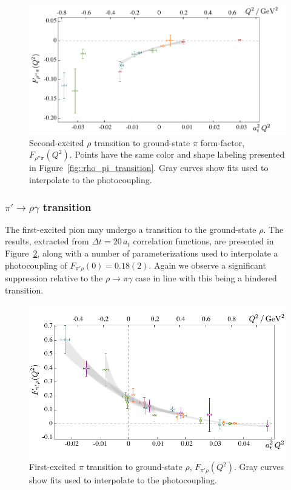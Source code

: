 \documentclass[twocolumn,amsmath,amssymb,prd,10pt,floatfix, 
superscriptaddress,nofootinbib, showpacs, preprintnumbers]{revtex4-1}
\begin{document}
\begin{figure}[h]
  \includegraphics[width=\linewidth]{fig20.pdf}
    \caption{ Second-excited $\rho$ transition to ground-state $\pi$ form-factor, $F_{\rho'' \pi}(Q^2)$. Points have the same color and shape labeling presented in Figure~\ref{fig::rho_pi_transition}. Gray curves show fits used to interpolate to the photocoupling. 
     \label{fig::rho2_pi_transition}}
\end{figure}



\subsubsection{$\pi' \rightarrow \rho \gamma$ transition}



The first-excited pion may undergo a transition to the ground-state $\rho$. The results, extracted from $\Delta t = 20 \, a_t$ correlation functions, are presented in Figure~\ref{fig::pi1_rho0_transition}, along with a number of parameterizations used to interpolate a photocoupling of $F_{\pi' \rho}(0) = 0.18(2)$. Again we observe a significant suppression relative to the $\rho \to \pi \gamma$ case in line with this being a hindered transition.

\begin{figure}[h]
  \vspace{-0.5cm}
  \includegraphics[width=\linewidth]{fig21.pdf}
  \vspace{-0.5cm}
    \caption{First-excited $\pi$ transition to ground-state $\rho$, $F_{\pi' \rho}(Q^2)$. Gray curves show fits used to interpolate to the photocoupling. \label{fig::pi1_rho0_transition}}
\end{figure}
\end{document}
